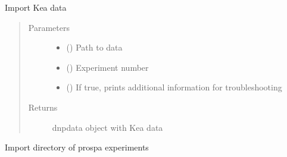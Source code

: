 \documentclass[letterpaper,10pt,english]{sphinxmanual}
\begin{document}
\begin{fulllineitems}
\label{\detokenize{dnpImport:dnpLab.dnpImport.prospa.import_prospa}}
Import Kea data
\begin{quote}\begin{description}
\item[{Parameters}] \leavevmode\begin{itemize}
\item {} 
 () \sphinxhyphen{}\sphinxhyphen{} Path to data

\item {} 
 () \sphinxhyphen{}\sphinxhyphen{} Experiment number

\item {} 
 () \sphinxhyphen{}\sphinxhyphen{} If true, prints additional information for troubleshooting

\end{itemize}

\item[{Returns}] \leavevmode
dnpdata object with Kea data

\end{description}\end{quote}

\end{fulllineitems}


\begin{fulllineitems}
\label{\detokenize{dnpImport:dnpLab.dnpImport.prospa.import_prospa_dir}}
Import directory of prospa experiments

\end{fulllineitems}
\end{document}

